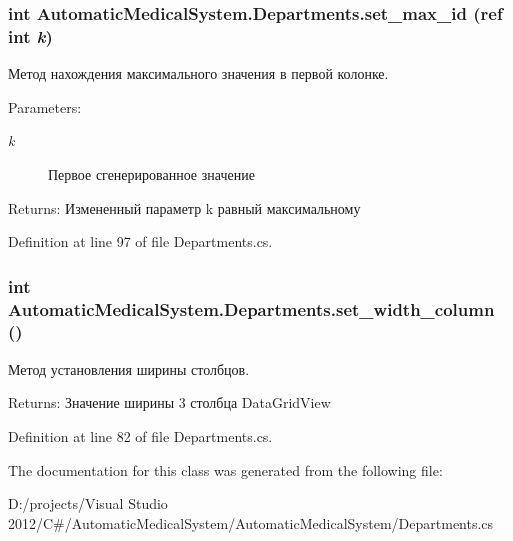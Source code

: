 \subsubsection[{set\_\-max\_\-id}]{\setlength{\rightskip}{0pt plus 5cm}int AutomaticMedicalSystem.Departments.set\_\-max\_\-id (ref int {\em k})}\label{class_automatic_medical_system_1_1_departments_2846623c15067213f1b15258be3a2d7a}


Метод нахождения максимального значения в первой колонке. 

\begin{Desc}
\item[Parameters:]
\begin{description}
\item[{\em k}]Первое сгенерированное значение\end{description}
\end{Desc}
\begin{Desc}
\item[Returns:]Измененный параметр k равный максимальному\end{Desc}


Definition at line 97 of file Departments.cs.
\subsubsection[{set\_\-width\_\-column}]{\setlength{\rightskip}{0pt plus 5cm}int AutomaticMedicalSystem.Departments.set\_\-width\_\-column ()}\label{class_automatic_medical_system_1_1_departments_8e1332b338b0602dd5bef837e62c7201}


Метод установления ширины столбцов. 

\begin{Desc}
\item[Returns:]Значение ширины 3 столбца DataGridView\end{Desc}


Definition at line 82 of file Departments.cs.

The documentation for this class was generated from the following file:\begin{CompactItemize}
\item 
D:/projects/Visual Studio 2012/C\#/AutomaticMedicalSystem/AutomaticMedicalSystem/Departments.cs\end{CompactItemize}
